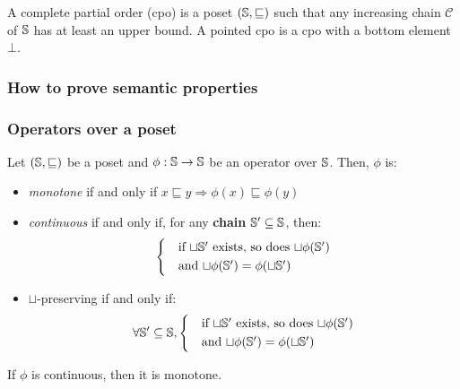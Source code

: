 \documentclass[toc, titlepaged]{../cs-classes/cs-classes}
\begin{document}
\begin{definition}
    A complete partial order (cpo) is a poset $(\S, \sqsubseteq)$ such that any increasing chain $\mathcal{C}$ of $\S$ has at least an upper bound. A pointed cpo is a cpo with a bottom element $\bot$.
\end{definition}

\subsubsection{How to prove semantic properties}

\subsubsection{Operators over a poset}
\begin{definition}
    Let $(\S, \sqsubseteq)$ be a poset and $\phi:\S\to\S$ be an operator over $\S$. Then, $\phi$ is:
    \begin{itemize}
        \item \emph{monotone} if and only if $x\sqsubseteq y\Rightarrow \phi(x)\sqsubseteq\phi(y)$
        \item \emph{continuous} if and only if, for any \textbf{chain} $\S'\subseteq \S$, then:
        \begin{equation*}
            \begin{cases*}
                &if $\sqcup\S'$ exists, so does $\sqcup\phi(\S')$\\
                &and $\sqcup\phi(\S')=\phi(\sqcup\S')$
            \end{cases*}
        \end{equation*}
        \item $\sqcup$-preserving if and only if:
        \begin{equation*}
            \forall\S'\subseteq\S, \begin{cases*}
                &if $\sqcup\S'$ exists, so does $\sqcup\phi(\S')$\\
                &and $\sqcup\phi(\S')=\phi(\sqcup\S')$
            \end{cases*}
        \end{equation*}
    \end{itemize}
\end{definition}

\begin{property}
    If $\phi$ is continuous, then it is monotone.
\end{property}
\end{document}
